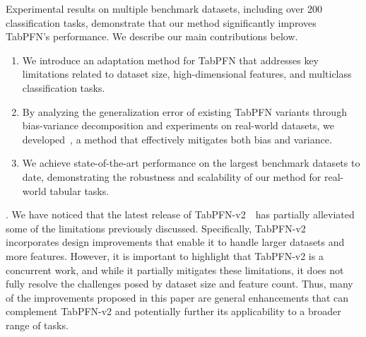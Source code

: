 Experimental results on multiple benchmark datasets, including over 200 classification tasks, demonstrate that our method significantly improves TabPFN's performance. We describe our main contributions below.
\begin{enumerate}[noitemsep,topsep=0pt,leftmargin=*]
    \item We introduce an adaptation method for TabPFN that addresses key limitations related to dataset size, high-dimensional features, and multiclass classification tasks.
    \item By analyzing the generalization error of existing TabPFN variants through bias-variance decomposition and experiments on real-world datasets, we developed~\name, a method that effectively mitigates both bias and variance. 
    \item We achieve state-of-the-art performance on the largest benchmark datasets to date, demonstrating the robustness and scalability of our method for real-world tabular tasks.
\end{enumerate}


.
We have noticed that the latest release of TabPFN-v2~\cite{hollmann2025tabpfn}~has partially alleviated some of the limitations previously discussed. Specifically, TabPFN-v2 incorporates design improvements that enable it to handle larger datasets and more features. However, it is important to highlight that TabPFN-v2 is a concurrent work, and while it partially mitigates these limitations, it does not fully resolve the challenges posed by dataset size and feature count. Thus, many of the improvements proposed in this paper are general enhancements that can complement TabPFN-v2 and potentially further its applicability to a broader range of tasks.
